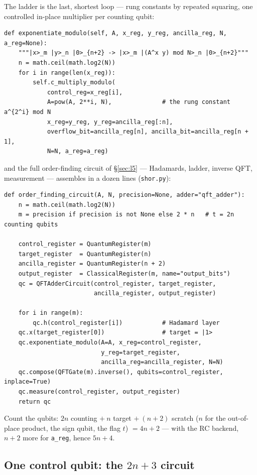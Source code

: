 \documentclass[11pt]{article}
\newcommand{\code}[1]{\texttt{#1}}
\theoremstyle{plain}
\theoremstyle{remark}
\begin{document}
The ladder is the last, shortest loop --- rung constants by repeated squaring, one controlled
in-place multiplier per counting qubit:

\begin{lstlisting}
def exponentiate_modulo(self, A, x_reg, y_reg, ancilla_reg, N, a_reg=None):
    """|x>_m |y>_n |0>_{n+2} -> |x>_m |(A^x y) mod N>_n |0>_{n+2}"""
    n = math.ceil(math.log2(N))
    for i in range(len(x_reg)):
        self.c_multiply_modulo(
            control_reg=x_reg[i],
            A=pow(A, 2**i, N),              # the rung constant a^{2^i} mod N
            x_reg=y_reg, y_reg=ancilla_reg[:n],
            overflow_bit=ancilla_reg[n], ancilla_bit=ancilla_reg[n + 1],
            N=N, a_reg=a_reg)
\end{lstlisting}

\noindent
and the full order-finding circuit of \S\ref{sec:l5} --- Hadamards, ladder, inverse QFT,
measurement --- assembles in a dozen lines (\code{shor.py}):

\begin{lstlisting}
def order_finding_circuit(A, N, precision=None, adder="qft_adder"):
    n = math.ceil(math.log2(N))
    m = precision if precision is not None else 2 * n   # t = 2n counting qubits

    control_register = QuantumRegister(m)
    target_register  = QuantumRegister(n)
    ancilla_register = QuantumRegister(n + 2)
    output_register  = ClassicalRegister(m, name="output_bits")
    qc = QFTAdderCircuit(control_register, target_register,
                         ancilla_register, output_register)

    for i in range(m):
        qc.h(control_register[i])           # Hadamard layer
    qc.x(target_register[0])                # target = |1>
    qc.exponentiate_modulo(A=A, x_reg=control_register,
                           y_reg=target_register,
                           ancilla_reg=ancilla_register, N=N)
    qc.compose(QFTGate(m).inverse(), qubits=control_register, inplace=True)
    qc.measure(control_register, output_register)
    return qc
\end{lstlisting}

\noindent
Count the qubits: $2n$ counting $+\ n$ target $+\ (n{+}2)$ scratch ($n$ for the out-of-place
product, the sign qubit, the flag $t$) $=4n+2$ --- with the RC backend, $n{+}2$ more for
\code{a\_reg}, hence $5n+4$.

\subsection{One control qubit: the $2n+3$ circuit}\label{sec:code-onectrl}
\end{document}
